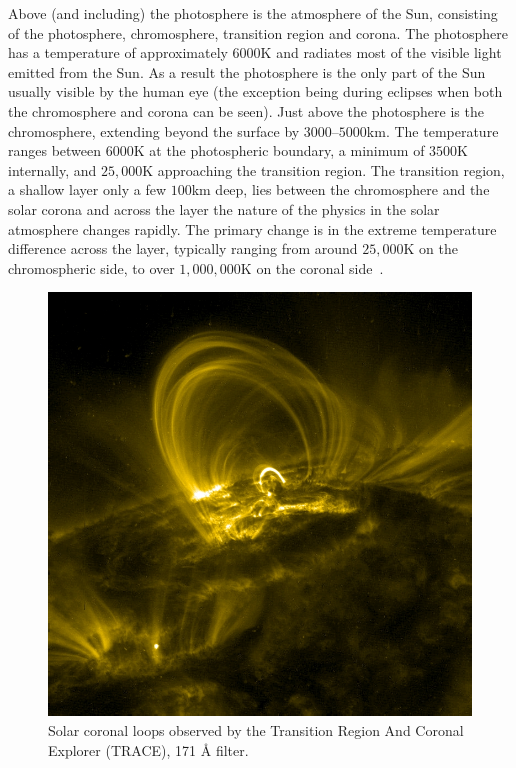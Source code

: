 Above (and including) the photosphere is the atmosphere of the Sun, consisting of the photosphere, chromosphere, transition region and corona. The photosphere has a temperature of approximately $6000$K and radiates most of the visible light emitted from the Sun. As a result the photosphere is the only part of the Sun usually visible by the human eye (the exception being during eclipses when both the chromosphere and corona can be seen). Just above the photosphere is the chromosphere, extending beyond the surface by $3000$--$5000$km. The temperature ranges between $6000$K at the photospheric boundary, a minimum of $3500$K internally, and $25,000$K approaching the transition region. The transition region, a shallow layer only a few $100$km deep, lies between the chromosphere and the solar corona and across the layer the nature of the physics in the solar atmosphere changes rapidly. The primary change is in the extreme temperature difference across the layer, typically ranging from around $25,000$K on the chromospheric side, to over $1,000,000$K on the coronal side~\cite{priestMagnetohydrodynamicsSuna,mandriniMagneticFieldPlasma2000}.

\begin{figure}[t]
  \centering
  \includegraphics[width=0.5\linewidth]{Traceimage.jpg}
  \caption{Solar coronal loops observed by the Transition Region And Coronal Explorer (TRACE), 171 Å filter.}%
  \label{fig:coronal_loops}
\end{figure}


